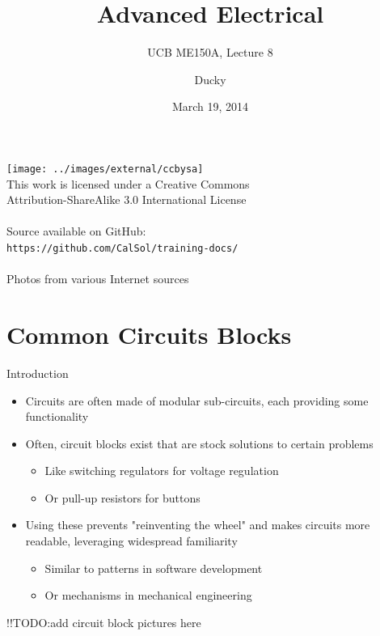 \documentclass{beamer}
\title{Advanced Electrical}
\subtitle{UCB ME150A, Lecture 8}
\author[Ducky]{Ducky}
\date{March 19, 2014}
\begin{document}
\begin{frame}[plain] \centering
  \titlepage
  \begin{center} 
  \texttt{[image: ../images/external/ccbysa]} \\
  \tiny This work is licensed under a Creative Commons \\
  Attribution-ShareAlike 3.0 International License \\
  ~ \\
  Source available on GitHub: \\
  \texttt{https://github.com/CalSol/training-docs/} \\
  ~ \\
  Photos from various Internet sources
   \end{center}
\end{frame}

\section{Common Circuits Blocks}
\begin{frame}{Introduction}
  \begin{itemize}
    \item Circuits are often made of modular sub-circuits, each providing some functionality
    \item Often, circuit blocks exist that are stock solutions to certain problems
    \begin{itemize}
      \item Like switching regulators for voltage regulation
      \item Or pull-up resistors for buttons
    \end{itemize}
    \item Using these prevents "reinventing the wheel" and makes circuits more readable, leveraging widespread familiarity
    \begin{itemize}
      \item Similar to patterns in software development
      \item Or mechanisms in mechanical engineering
    \end{itemize}
  \end{itemize}
  !!TODO:add circuit block pictures here
\end{frame}
\end{document}
